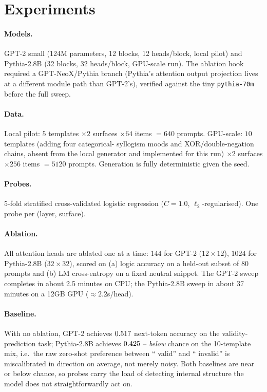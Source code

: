 \section{Experiments}

\paragraph{Models.} GPT-2 small (124M parameters, 12 blocks, 12 heads/block,
local pilot) and Pythia-2.8B (32 blocks, 32 heads/block, GPU-scale run).
The ablation hook required a GPT-NeoX/Pythia branch (Pythia's attention
output projection lives at a different module path than GPT-2's),
verified against the tiny \texttt{pythia-70m} before the full sweep.

\paragraph{Data.} Local pilot: $5$ templates $\times2$ surfaces $\times64$
items $=640$ prompts. GPU-scale: $10$ templates (adding four categorical-
syllogism moods and XOR/double-negation chains, absent from the local
generator and implemented for this run) $\times2$ surfaces $\times256$
items $=5120$ prompts. Generation is fully deterministic given the seed.

\paragraph{Probes.} 5-fold stratified cross-validated logistic regression
($C=1.0$, $\ell_2$-regularised). One probe per (layer, surface).

\paragraph{Ablation.} All attention heads are ablated one at a time: $144$
for GPT-2 ($12\times12$), $1024$ for Pythia-2.8B ($32\times32$), scored on
(a) logic accuracy on a held-out subset of $80$ prompts and (b) LM
cross-entropy on a fixed neutral snippet. The GPT-2 sweep completes in
about 2.5 minutes on CPU; the Pythia-2.8B sweep in about 37 minutes on a
12GB GPU ($\approx2.2$s/head).

\paragraph{Baseline.} With no ablation, GPT-2 achieves $0.517$
next-token accuracy on the validity-prediction task; Pythia-2.8B achieves
$0.425$ -- \emph{below} chance on the 10-template
mix, i.e.\ the raw zero-shot preference between `` valid'' and `` invalid''
is miscalibrated in direction on average, not merely noisy. Both baselines
are near or below chance, so probes carry the load of detecting internal
structure the model does not straightforwardly act on.
